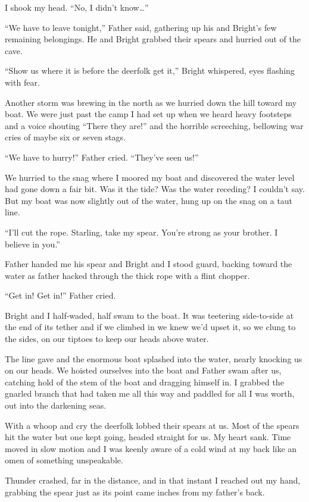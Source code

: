 I shook my head. ``No, I didn't know\ldots''

``We have to leave tonight,'' Father said, gathering up his and Bright's few remaining belongings. He and Bright grabbed their spears and hurried out of the cave.

``Show us where it is before the deerfolk get it,'' Bright whispered, eyes flashing with fear.

Another storm was brewing in the north as we hurried down the hill toward my boat. We were just past the camp I had set up when we heard heavy footsteps and a voice shouting ``There they are!'' and the horrible screeching, bellowing war cries of maybe six or seven stags.

``We have to hurry!'' Father cried. ``They've seen us!''

We hurried to the snag where I moored my boat and discovered the water level had gone down a fair bit. Was it the tide? Was the water receding? I couldn't say. But my boat was now slightly out of the water, hung up on the snag on a taut line.

``I'll cut the rope. Starling, take my spear. You're strong as your brother. I believe in you.''

Father handed me his spear and Bright and I stood guard, backing toward the water as father hacked through the thick rope with a flint chopper.

``Get in! Get in!'' Father cried.

Bright and I half-waded, half swam to the boat. It was teetering side-to-side at the end of its tether and if we climbed in we knew we'd upset it, so we clung to the sides, on our tiptoes to keep our heads above water.

The line gave and the enormous boat splashed into the water, nearly knocking us on our heads. We hoisted ourselves into the boat and Father swam after us, catching hold of the stem of the boat and dragging himself in. I grabbed the gnarled branch that had taken me all this way and paddled for all I was worth, out into the darkening seas.

With a whoop and cry the deerfolk lobbed their spears at us. Most of the spears hit the water but one kept going, headed straight for us. My heart sank. Time moved in slow motion and I was keenly aware of a cold wind at my back like an omen of something unspeakable.

Thunder crashed, far in the distance, and in that instant I reached out my hand, grabbing the spear just as its point came inches from my father's back.

